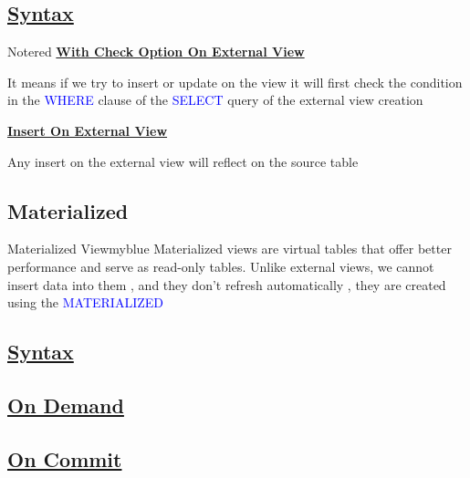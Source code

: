 \subsection*{\underline{Syntax}}



\vspace{0.25cm}
\begin{prettyBox}{Note}{red}
\textbf{\underline{With Check Option On External View}}

\vspace{0.15cm}
It means if we try to insert or update on the view it will first check
the condition in the \textcolor{blue}{WHERE} clause of the \textcolor{blue}{SELECT} query of the external view creation 

\vspace{0.15cm}
\textbf{\underline{Insert On External View}}

\vspace{0.15cm}
Any insert on the external view will reflect on the source table 



\end{prettyBox}

\subsection{Materialized}


\begin{prettyBox}{Materialized View}{myblue}
Materialized views are virtual tables that offer better performance and serve as read-only tables. Unlike external views, we cannot insert data into them , and they don't
refresh automatically , they are created using the \textcolor{blue}{MATERIALIZED}
\end{prettyBox}

\subsection*{\underline{Syntax}}

\subsection*{\underline{On Demand}}



\subsection*{\underline{On Commit}} 


